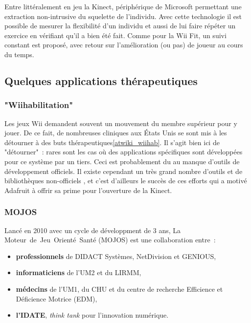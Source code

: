 Entre littéralement en jeu la Kinect, périphérique de Microsoft permettant une
extraction non-intrusive du squelette de l'individu. Avec cette technologie
il est possible de mesurer la flexibilité d'un individu et aussi de lui faire répéter
un exercice en vérifiant qu'il a bien été fait. 
Comme pour la Wii Fit, un suivi constant est proposé, avec retour sur
l'amélioration (ou pas) de joueur au cours du temps.



\subsection{Quelques applications thérapeutiques}

\subsubsection{"Wiihabilitation"}

Les jeux Wii demandent souvent un mouvement du membre supérieur pour y 
jouer. De ce fait, de nombreuses 
cliniques aux États Unis se sont mis à les détourner à des buts 
thérapeutiques\ref{atwiki_wiihab}. Il s'agit bien ici de "détourner"~: rares sont les cas où des
applications spécifiques sont développées pour ce système par un tiers. Ceci
est probablement du au manque d'outils de développement officiels. Il existe
cependant un très grand nombre d'outils et de bibliothèques non-officiels
\cite{homebrew_wii}, et
c'est d'ailleurs le succès de ces efforts qui a motivé Adafruit à offrir sa prime
pour l'ouverture de la Kinect.

\subsubsection{MOJOS}
Lancé en 2010 avec un cycle de développment de 3 ans, 
La Moteur~de~Jeu~Orienté~Santé (MOJOS) est une collaboration entre~:
\begin{itemize}
\item \textbf{professionnels} de DIDACT Systèmes, NetDivision et GENIOUS,
\item \textbf{informaticiens} de l'UM2 et du LIRMM,
\item \textbf{médecins} de l'UM1, du CHU et du centre 
de recherche Efficience et Déficience Motrice (EDM),
\item \textbf{l'IDATE}, \emph{think tank} pour l'innovation numérique.
\end{itemize}\cite{mojos}

